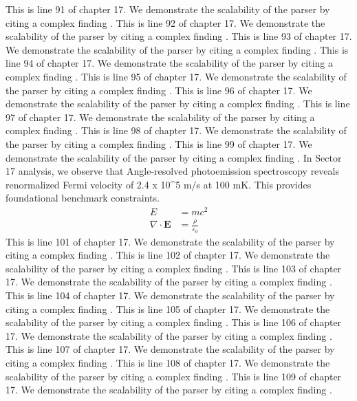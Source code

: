 This is line 91 of chapter 17. We demonstrate the scalability of the parser by citing a complex finding \cite{ref17_91}.
This is line 92 of chapter 17. We demonstrate the scalability of the parser by citing a complex finding \cite{ref17_92}.
This is line 93 of chapter 17. We demonstrate the scalability of the parser by citing a complex finding \cite{ref17_93}.
This is line 94 of chapter 17. We demonstrate the scalability of the parser by citing a complex finding \cite{ref17_94}.
This is line 95 of chapter 17. We demonstrate the scalability of the parser by citing a complex finding \cite{ref17_95}.
This is line 96 of chapter 17. We demonstrate the scalability of the parser by citing a complex finding \cite{ref17_96}.
This is line 97 of chapter 17. We demonstrate the scalability of the parser by citing a complex finding \cite{ref17_97}.
This is line 98 of chapter 17. We demonstrate the scalability of the parser by citing a complex finding \cite{ref17_98}.
This is line 99 of chapter 17. We demonstrate the scalability of the parser by citing a complex finding \cite{ref17_99}.
In Sector 17 analysis, we observe that Angle-resolved photoemission spectroscopy reveals renormalized Fermi velocity of 2.4 x 10^5 m/s at 100 mK. This provides foundational benchmark constraints.
\begin{align*}
  E &= mc^2 \\
  \nabla \cdot \mathbf{E} &= \frac{\rho}{\varepsilon_0}
\end{align*}
This is line 101 of chapter 17. We demonstrate the scalability of the parser by citing a complex finding \cite{ref17_101}.
This is line 102 of chapter 17. We demonstrate the scalability of the parser by citing a complex finding \cite{ref17_102}.
This is line 103 of chapter 17. We demonstrate the scalability of the parser by citing a complex finding \cite{ref17_103}.
This is line 104 of chapter 17. We demonstrate the scalability of the parser by citing a complex finding \cite{ref17_104}.
This is line 105 of chapter 17. We demonstrate the scalability of the parser by citing a complex finding \cite{ref17_105}.
This is line 106 of chapter 17. We demonstrate the scalability of the parser by citing a complex finding \cite{ref17_106}.
This is line 107 of chapter 17. We demonstrate the scalability of the parser by citing a complex finding \cite{ref17_107}.
This is line 108 of chapter 17. We demonstrate the scalability of the parser by citing a complex finding \cite{ref17_108}.
This is line 109 of chapter 17. We demonstrate the scalability of the parser by citing a complex finding \cite{ref17_109}.
